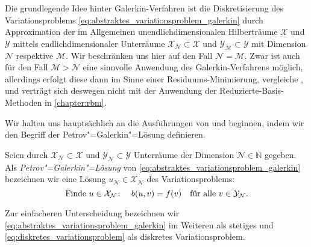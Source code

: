 \documentclass[../main.tex]{subfiles}
\begin{document}
Die grundlegende Idee hinter Galerkin-Verfahren ist die Diskretisierung des Variationsproblems \cref{eq:abstraktes_variationsproblem_galerkin} durch Approximation der im Allgemeinen unendlichdimensionalen Hilberträume $\mathcal X$ und $\mathcal Y$ mittels endlichdimensionaler Unterräume $\mathcal X_{\mathcal N} \subset \mathcal X$ und $\mathcal Y_{\mathcal M} \subset \mathcal Y$ mit Dimension $\mathcal N$ respektive $\mathcal M$.
Wir beschränken uns hier auf den Fall $\mathcal N = \mathcal M$.
Zwar ist auch für den Fall $\mathcal M > \mathcal N$ eine sinnvolle Anwendung des Galerkin-Verfahrens möglich, allerdings erfolgt diese dann im Sinne einer Residuums-Minimierung, vergleiche \cite{Andreev:2012ep}, und verträgt sich deswegen nicht mit der Anwendung der Reduzierte-Basis-Methoden in \cref{chapter:rbm}.

Wir halten uns hauptsächlich an die Ausführungen von \textcite[Section 3.1]{Nochetto:2009il} und beginnen, indem wir den Begriff der Petrov"=Galerkin"=Lösung definieren.

\begin{Definition}
    \label{definition:disrekte_loesung}
    Seien durch $\mathcal X_{\mathcal N} \subset \mathcal X$ und $\mathcal Y_{\mathcal N} \subset \mathcal Y$ Unterräume der Dimension $\mathcal N \in \mathbb{N}$ gegeben.
    Als \emph{Petrov"=Galerkin"=Lösung} von \cref{eq:abstraktes_variationsproblem_galerkin} bezeichnen wir eine Lösung $u_{\mathcal N} \in \mathcal X_{\mathcal N}$ des Variationsproblems:
    \begin{equation}
        \label{eq:diskretes_variationsproblem}
        \text{Finde}~u \in \mathcal X_{\mathcal N} \colon \quad  b(u, v) = f(v) \quad \fa v \in \mathcal Y_{\mathcal N}.
    \end{equation}
\end{Definition}

Zur einfacheren Unterscheidung bezeichnen wir \cref{eq:abstraktes_variationsproblem_galerkin} im Weiteren als stetiges und \cref{eq:diskretes_variationsproblem} als diskretes Variationsproblem.
\end{document}
